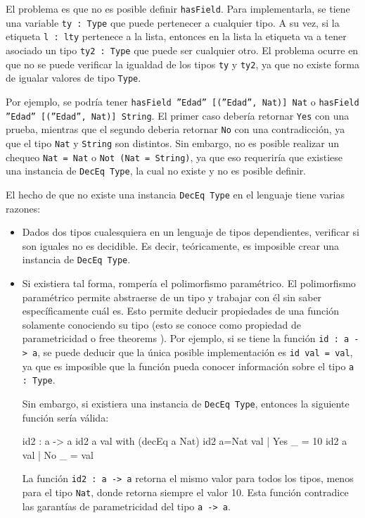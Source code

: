 El problema es que no es posible definir \texttt{hasField}. Para implementarla, se tiene una variable \texttt{ty : Type} que puede pertenecer a cualquier tipo. A su vez, si la etiqueta \texttt{l : lty} pertenece a la lista, entonces en la lista la etiqueta va a tener asociado un tipo \texttt{ty2 : Type} que puede ser cualquier otro. El problema ocurre en que no se puede verificar la igualdad de los tipos \texttt{ty} y \texttt{ty2}, ya que no existe forma de igualar valores de tipo \texttt{Type}.

Por ejemplo, se podría tener \texttt{hasField ''Edad'' [(''Edad'', Nat)] Nat} o \texttt{hasField ''Edad'' [(''Edad'', Nat)] String}. El primer caso debería retornar \texttt{Yes} con una prueba, mientras que el segundo deberia retornar \texttt{No} con una contradicción, ya que el tipo \texttt{Nat} y \texttt{String} son distintos. Sin embargo, no es posible realizar un chequeo \texttt{Nat = Nat} o \texttt{Not (Nat = String)}, ya que eso requeriría que existiese una instancia de \texttt{DecEq Type}, la cual no existe y no es posible definir.

El hecho de que no existe una instancia \texttt{DecEq Type} en el lenguaje tiene varias razones:

\begin{itemize}
\item Dados dos tipos cualesquiera en un lenguaje de tipos dependientes, verificar si son iguales no es decidible. Es decir, teóricamente, es imposible crear una instancia de \texttt{DecEq Type}.
\item Si existiera tal forma, rompería el polimorfismo paramétrico. El polimorfismo paramétrico permite abstraerse de un tipo y trabajar con él sin saber específicamente cuál es. Esto permite deducir propiedades de una función solamente conociendo su tipo (esto se conoce como propiedad de parametricidad o free theorems \cite{Wadler:1989:TF:99370.99404}). Por ejemplo, si se tiene la función \texttt{id : a -> a}, se puede deducir que la única posible implementación es \texttt{id val = val}, ya que es imposible que la función pueda conocer información sobre el tipo \texttt{a : Type}.

Sin embargo, si existiera una instancia de \texttt{DecEq Type}, entonces la siguiente función sería válida:

\begin{code}
id2 : a -> a
id2 {a} val with (decEq a Nat)
  id2 {a=Nat} val | Yes _ = 10
  id2 {a} val | No _ = val
\end{code}

La función \texttt{id2 : a -> a} retorna el mismo valor para todos los tipos, menos para el tipo \texttt{Nat}, donde retorna siempre el valor 10. Esta función contradice las garantías de parametricidad del tipo \texttt{a -> a}.
\end{itemize}

